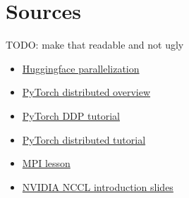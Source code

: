\section{Sources}
TODO: make that readable and not ugly
\begin{itemize}
    \item \href{https://huggingface.co/docs/transformers/main/en/perf_train_gpu_many#data-parallelism}{Huggingface parallelization}
    \item \href{https://pytorch.org/tutorials/beginner/dist_overview.html}{PyTorch distributed overview}
    \item \href{https://pytorch.org/tutorials/intermediate/ddp_tutorial.html}{PyTorch DDP tutorial}
    \item \href{https://pytorch.org/tutorials/intermediate/dist_tuto.html}{PyTorch distributed tutorial}
    \item \href{https://indico.desy.de/event/12535/contributions/9450/attachments/6466/7452/CL5_MPI_Lecture.pdf}{MPI lesson}
    \item \href{https://images.nvidia.com/events/sc15/pdfs/NCCL-Woolley.pdf}{NVIDIA NCCL introduction slides}
\end{itemize}